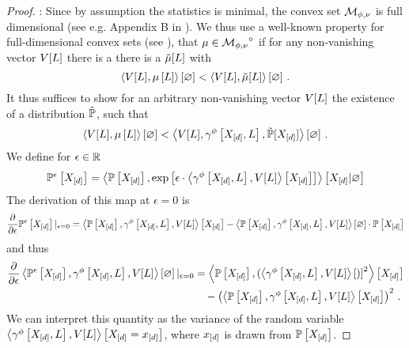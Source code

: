 \begin{proof}
	\proofleftsymbol: %
		Since by assumption the statistics is minimal, the convex set $\mathcal{M}_{\phi,\nu}$ is full dimensional (see e.g. Appendix B in \cite{wainwright_graphical_2008}). 
		We thus use a well-known property for full-dimensional convex sets (see \cite{rockafellar_convex_1997,hiriart-urruty_convex_1993}), that $\mu\in{\mathcal{M}_{\phi,\nu}}^{\circ}$ if for any non-vanishing vector $V[L]$ there is a  %
		there is a $\tilde{\mu}[L]$ with
			\[ \left\langle V[L],\mu\left[L\right]\right\rangle \left[ \varnothing \right] <  \left\langle V[L],\tilde{\mu}[L]\right\rangle \left[ \varnothing \right] \, . \]
		It thus suffices to show for an arbitrary non-vanishing vector $V[L]$ the existence of a distribution $\tilde{\mathbb{P}}$, such that
		\begin{align*}
			\left\langle V[L],\mu\left[L\right]\right\rangle \left[ \varnothing \right] < \left\langle V[L],\gamma^{\phi}\left[X_{[d]},L\right],\tilde{\mathbb{P}}[X_{[d]}]\right\rangle \left[ \varnothing \right] \, .
		\end{align*}
		We define for $\epsilon\in\mathbb{R}$
		\begin{align*}
			\mathbb{P}^{\epsilon}\left[X_{[d]}\right] 
			= \left\langle \mathbb{P}\left[X_{[d]}\right],\mathrm{exp}\left[\epsilon\cdot\left\langle \gamma^{\phi}\left[X_{[d]},L\right],V[L]\right\rangle \left[ X_{[d]} \right]\right]\right\rangle \left[ X_{[d]} | \varnothing \right]
		\end{align*}
		The derivation of this map at $\epsilon=0$ is 
		\begin{align*}
			\frac{\partial }{\partial \epsilon}\mathbb{P}^{\epsilon}\left[X_{[d]}\right]|_{\epsilon=0}
			= \left\langle \mathbb{P}\left[X_{[d]}\right],\gamma^{\phi}\left[X_{[d]},L\right],V[L]\right\rangle \left[ X_{[d]} \right] - \left\langle \mathbb{P}\left[X_{[d]}\right],\gamma^{\phi}\left[X_{[d]},L\right],V[L]\right\rangle \left[ \varnothing \right] \cdot \mathbb{P}\left[X_{[d]}\right] 
		\end{align*}
		and thus
		\begin{align*}
			\frac{\partial }{\partial \epsilon} \left\langle \mathbb{P}^{\epsilon}\left[X_{[d]}\right],\gamma^{\phi}\left[X_{[d]},L\right],V[L]\right\rangle \left[ \varnothing \right]|_{\epsilon=0}
			&= \left\langle \mathbb{P}\left[X_{[d]}\right],(\left\langle \gamma^{\phi}\left[X_{[d]},L\right],V[L]\right\rangle \left[ ) \right]^2\right\rangle \left[ X_{[d]} \right] \\
			 & \quad - \left(\left\langle \mathbb{P}\left[X_{[d]}\right],\gamma^{\phi}\left[X_{[d]},L\right],V[L]\right\rangle \left[ X_{[d]} \right]\right)^2 \, . 
		\end{align*}
		We can interpret this quantity as the variance of the random variable $\left\langle \gamma^{\phi}\left[X_{[d]},L\right],V[L]\right\rangle \left[ X_{[d]}=x_{[d]} \right]$, where $x_{[d]}$ is drawn from $\mathbb{P}\left[X_{[d]}\right]$.

\end{proof}
